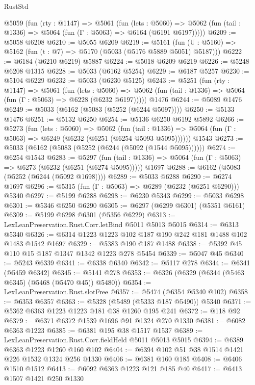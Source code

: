 \begin{lexlean}{RustStd}
\begin{coremodule}
{\begin{coremodule}
{{{{{{{{{{{{{{{{{{{{{{{{{{{{{{{{{{  @5059
    (fun (rty : @1147) =>
    @5061
      (fun (lets : @5060) =>
      @5062 (fun (tail : @1336) => @5064 (fun (Γ : @5063) => @6164 (@6191 @6197)))))
@6209 := @5058 @6208
@6210 := @5055 @6209
@6219 := @5161 (fun (U : @5160) => @5162 (fun (t : @7) => @5170 (@5033 (@5176 @5889 @5051) @5187)))
@6222 := @6184 (@6210 @6219) @5887
@6224 := @5018 @6209 @6219
@6226 := @5248 @6208 @1315
@6228 := @5033 (@6162 @5254)
@6229 := @6187 @5257
@6230 := @5104 @6229
@6232 := @5033 (@6230 @5125)
@6243 := @5251
    (fun (rty : @1147) =>
    @5061
      (fun (lets : @5060) =>
      @5062 (fun (tail : @1336) => @5064 (fun (Γ : @5063) => @6228 (@6232 @6197)))))
    @1476
@6244 := @5089 @1476
@6249 := @5033 (@6162 (@5083 (@5252 (@6244 @5097))))
@6250 := @5133 @1476
@6251 := @5132 @6250
@6254 := @5136 @6250 @6192 @5892
@6266 := @5273
    (fun (lets : @5060) =>
    @5062
      (fun (tail : @1336) => @5064 (fun (Γ : @5063) => @6249 (@6232 (@6251 (@6254 @5093 @5095))))))
    @1543
@6273 := @5033 (@6162 (@5083 (@5252 (@6244 (@5092 (@1544 @5095))))))
@6274 := @6254 @1543
@6283 := @5297
    (fun (tail : @1336) => @5064 (fun (Γ : @5063) => @6273 (@6232 (@6251 (@6274 @5095)))))
    @1697
@6288 := @6162 (@5083 (@5252 (@6244 (@5092 @1698))))
@6289 := @5033 @6288
@6290 := @6274 @1697
@6296 := @5315 (fun (Γ : @5063) => @6289 (@6232 (@6251 @6290))) @5340
@6297 := @5199 @6288
@6298 := @6230 @5343
@6299 := @5033 @6298
@6301 := @5346 @6250 @6290
@6305 := @6297 (@6299 @6301) (@5351 @6161)
@6309 := @5199 @6298 @6301 (@5356 @6229)
@6313 := LexLeanPreservation.Rust.Corr.letBind @5011 @5013 @5015
@6314 := @6313 @5340
@6326 := @6314 @1223 @1223 @102 @187 @190 @242 @181 @1488 @102 @1483 @1542 @1697
@6329 := @5383 @190 @187 @1488
@6338 := @5392 @45 @110 @15 @187 @1347 @1342 @1223 @278 @5454
@6339 := @5047 @45
@6340 := @5243 @6339
@6341 := @6338 @6340
@6342 := @5117 @278
@6344 := @6341 (@5459 @6342)
@6345 := @5141 @278
@6353 := @6326 (@6329 (@6344 (@5463 @6345) (@5468 (@5470 @45)) @5480))
@6354 := LexLeanPreservation.Rust.slotFree
@6357 := @5474 (@6354 @5340 @102)
@6358 := @6353 @6357
@6363 := @5328 (@5489 (@5333 @187 @5490)) @5340
@6371 := @5362 @6363 @1223 @1223 @181 @38 @1260 @195 @241
@6372 := @118 @92
@6379 := @6371 @6372 @1539 @1696 @91 @1324 @270 @1330
@6381 := @6082 @6363 @1223
@6385 := @6381 @195 @38 @1517 @1537
@6389 := LexLeanPreservation.Rust.Corr.fieldHeld @5011 @5013 @5015
@6394 := @6389 @6363 @1223 @1260 @160 @102
@6404 := @6394 @102 @51 @38 @1514 @1421 @226 @1532 @1324 @256 @1330
@6406 := @6381 @160 @185
@6408 := @6406 @1510 @1512
@6413 := @6092 @6363 @1223 @121 @185 @40
@6417 := @6413 @1507 @1421 @250 @1330
}}}}}}}}}}}}}}}}}}}}}}}}}}}}}}}}}}
\end{coremodule}}
\end{coremodule}
\end{lexlean}
